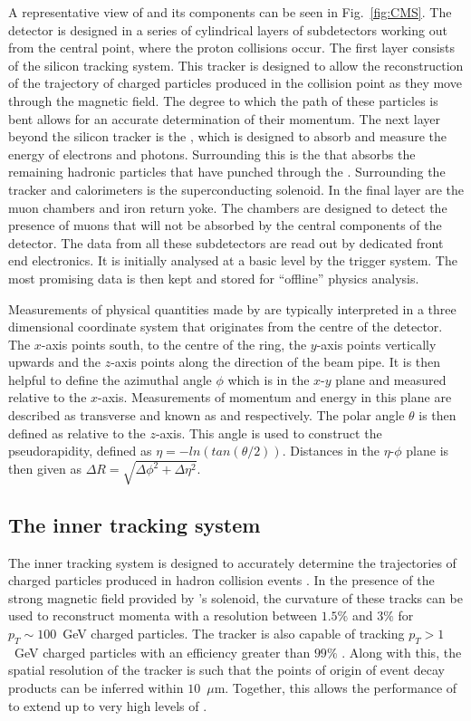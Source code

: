 A representative view of \CMS and its components can be seen in
Fig.~\ref{fig:CMS}. The detector is designed in a series of
cylindrical layers of subdetectors working out from the central point,
where the proton collisions occur. The first layer consists of the
silicon tracking system. This tracker is designed to allow the
reconstruction of the trajectory of charged particles produced in the
collision point as they move through the magnetic field. The degree to
which the path of these particles is bent allows for an accurate
determination of their momentum. The next layer beyond the silicon
tracker is the \ECAL, which is designed to absorb and measure the
energy of electrons and photons. Surrounding this is the \HCAL that
absorbs the remaining hadronic particles that have punched through the
\ECAL. Surrounding the tracker and calorimeters is the superconducting
solenoid. In the final layer are the muon chambers and iron return
yoke. The chambers are designed to detect the presence of muons that
will not be absorbed by the central components of the detector. The
data from all these subdetectors are read out by dedicated front end
electronics. It is initially analysed at a basic level by the \CMS
trigger system. The most promising data is then kept and stored for
``offline'' physics analysis. 

Measurements of physical quantities made by \CMS are typically
interpreted in a three dimensional coordinate system that originates
from the centre of the detector. The $x$-axis points south, to the
centre of the \LHC ring, the $y$-axis points vertically upwards and
the $z$-axis points along the direction of the \LHC beam pipe. It is
then helpful to define the azimuthal angle $\phi$ which is in the
$x$-$y$ plane and measured relative to the $x$-axis. Measurements of
momentum and energy in this plane are described as transverse and
known as \pt and \Et respectively. The polar angle $\theta$ is then
defined as relative to the $z$-axis. This angle is used to construct
the pseudorapidity, defined as $\eta=-ln(tan(\theta/2))$. Distances in
the $\eta$-$\phi$ plane is then given as $\Delta R =
\sqrt{\Delta\phi^2+\Delta\eta^2}$.

\subsection{The inner tracking system} 

The \CMS inner tracking system is designed to accurately determine the
trajectories of charged particles produced in hadron collision events
\cite{Karimaki:368412}. In the presence of the strong magnetic field
provided by \CMS's solenoid, the curvature of these tracks can be used
to reconstruct momenta with a resolution between $1.5\%$ and $3\%$ for
$p_T\sim 100$~GeV charged particles. The tracker is also capable of
tracking \mbox{$p_T>1$~GeV} charged particles with an efficiency
greater than $99\%$ \cite{Bayatian:2006zz}. Along with this, the
spatial resolution of the tracker is such that the points of origin of
event decay products can be inferred within $10$~$\mu$m. Together,
this allows the performance of \CMS to extend up to very high levels
of \PU \cite{CMSTrackPerformance}.


